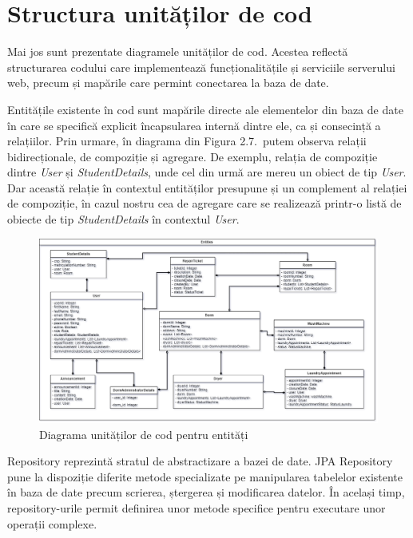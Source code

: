 \documentclass[12pt,a4paper]{report}
\theoremstyle{definition}
\theoremstyle{remark}
\begin{document}
\section{Structura unităților de cod}
\par Mai jos sunt prezentate diagramele unităților de cod. Acestea reflectă structurarea codului care implementează funcționalitățile și serviciile serverului web, precum și mapările care permint conectarea la baza de date.

\par Entitățile existente în cod sunt mapările directe ale elementelor din baza de date în care se specifică explicit încapsularea internă dintre ele, ca și consecință a relațiilor. Prin urmare, în diagrama din Figura 2.7.\ putem observa relații bidirecționale, de compoziție și agregare. De exemplu, relația de compoziție dintre \textit{User} și \textit{StudentDetails}, unde cel din urmă are mereu un obiect de tip \textit{User}. Dar această relație în contextul entităților presupune și un complement al relației de compoziție, în cazul nostru cea de agregare care se realizează printr-o listă de obiecte de tip \textit{StudentDetails} în contextul \textit{User}.

\begin{figure}[H]
    \centering
    \includegraphics[width=1\linewidth]{resurse/diagrame/uvtdorms1.2.drawio.png}
    \caption{Diagrama unităților de cod pentru entități}
\end{figure}

\par Repository reprezintă stratul de abstractizare a bazei de date. JPA Repository pune la dispoziție diferite metode specializate pe manipularea tabelelor existente în baza de date precum scrierea, ștergerea și modificarea datelor. În același timp, \textnormal{re\-po\-si\-to\-ry-urile} permit definirea unor metode specifice pentru executare unor operații complexe.
\end{document}

